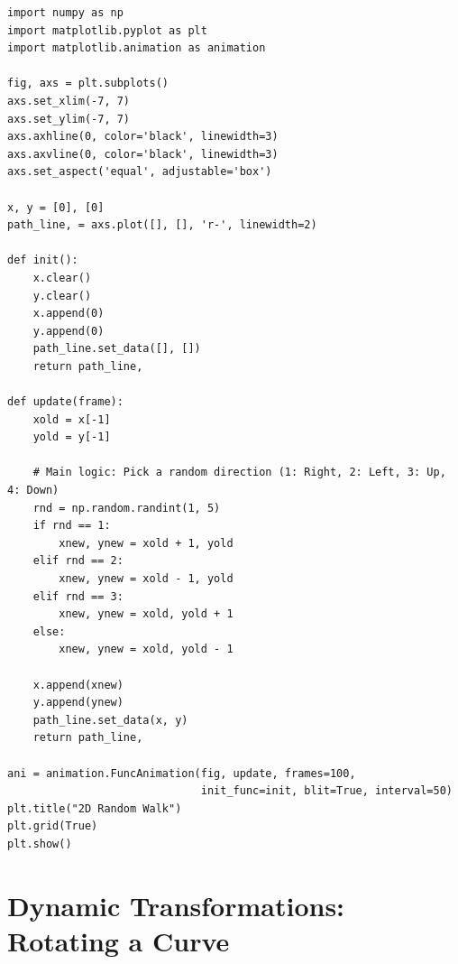 \documentclass[12pt, a4paper]{report}
\begin{document}
\begin{lstlisting}[caption={Simulating a 2D Random Walk}]
import numpy as np
import matplotlib.pyplot as plt
import matplotlib.animation as animation

fig, axs = plt.subplots()
axs.set_xlim(-7, 7)
axs.set_ylim(-7, 7)
axs.axhline(0, color='black', linewidth=3)   
axs.axvline(0, color='black', linewidth=3) 
axs.set_aspect('equal', adjustable='box')

x, y = [0], [0]
path_line, = axs.plot([], [], 'r-', linewidth=2)

def init():
    x.clear()
    y.clear()
    x.append(0)
    y.append(0)
    path_line.set_data([], [])
    return path_line,

def update(frame):
    xold = x[-1]
    yold = y[-1]
    
    # Main logic: Pick a random direction (1: Right, 2: Left, 3: Up, 4: Down)
    rnd = np.random.randint(1, 5)
    if rnd == 1:
        xnew, ynew = xold + 1, yold
    elif rnd == 2:
        xnew, ynew = xold - 1, yold
    elif rnd == 3:
        xnew, ynew = xold, yold + 1
    else:
        xnew, ynew = xold, yold - 1
        
    x.append(xnew)
    y.append(ynew)
    path_line.set_data(x, y)
    return path_line,

ani = animation.FuncAnimation(fig, update, frames=100, 
                              init_func=init, blit=True, interval=50)
plt.title("2D Random Walk")
plt.grid(True)
plt.show()
\end{lstlisting}

\newpage
\section{Dynamic Transformations: Rotating a Curve}
\end{document}

